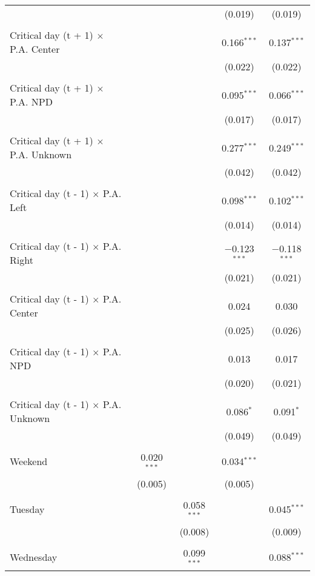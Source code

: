 \documentclass[
]{article}
\begin{document}
\begin{table}[!htbp]
{\begin{tabular}{@{\extracolsep{5pt}}lcccc}
  &  &  & (0.019) & (0.019) \\ 
  & & & & \\ 
 Critical day (t + 1) $\times$ P.A. Center &  &  & 0.166$^{***}$ & 0.137$^{***}$ \\ 
  &  &  & (0.022) & (0.022) \\ 
  & & & & \\ 
 Critical day (t + 1) $\times$ P.A. NPD &  &  & 0.095$^{***}$ & 0.066$^{***}$ \\ 
  &  &  & (0.017) & (0.017) \\ 
  & & & & \\ 
 Critical day (t + 1) $\times$ P.A. Unknown &  &  & 0.277$^{***}$ & 0.249$^{***}$ \\ 
  &  &  & (0.042) & (0.042) \\ 
  & & & & \\ 
 Critical day (t - 1) $\times$ P.A. Left &  &  & 0.098$^{***}$ & 0.102$^{***}$ \\ 
  &  &  & (0.014) & (0.014) \\ 
  & & & & \\ 
 Critical day (t - 1) $\times$ P.A. Right &  &  & $-$0.123$^{***}$ & $-$0.118$^{***}$ \\ 
  &  &  & (0.021) & (0.021) \\ 
  & & & & \\ 
 Critical day (t - 1) $\times$ P.A. Center &  &  & 0.024 & 0.030 \\ 
  &  &  & (0.025) & (0.026) \\ 
  & & & & \\ 
 Critical day (t - 1) $\times$ P.A. NPD &  &  & 0.013 & 0.017 \\ 
  &  &  & (0.020) & (0.021) \\ 
  & & & & \\ 
 Critical day (t - 1) $\times$ P.A. Unknown &  &  & 0.086$^{*}$ & 0.091$^{*}$ \\ 
  &  &  & (0.049) & (0.049) \\ 
  & & & & \\ 
 Weekend & 0.020$^{***}$ &  & 0.034$^{***}$ &  \\ 
  & (0.005) &  & (0.005) &  \\ 
  & & & & \\ 
 Tuesday &  & 0.058$^{***}$ &  & 0.045$^{***}$ \\ 
  &  & (0.008) &  & (0.009) \\ 
  & & & & \\ 
 Wednesday &  & 0.099$^{***}$ &  & 0.088$^{***}$ \\ 

\end{tabular}}
\end{table}
\end{document}
